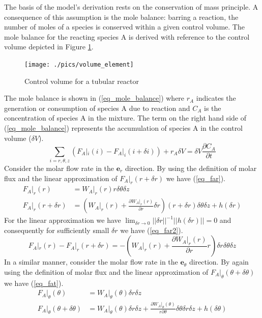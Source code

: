 \documentclass[11pt,fleqn]{article}
\theoremstyle{defstyle}
\begin{document}
The basis of the model's derivation rests on the conservation of mass principle. A consequence of this assumption is the mole balance: barring a reaction, the number of moles of a species is conserved within a given control volume. The mole balance for the reacting species A is derived with reference to the control volume depicted in Figure \ref{fig_vol_element}.

\begin{figure}[H] 
\centering
\texttt{[image: ./pics/volume\_element]}
\caption{Control volume for a tubular reactor} 
\label{fig_vol_element}
\end{figure}

The mole balance is shown in (\ref{eq_mole_balance}) where $r_A$ indicates the generation or consumption of species A due to reaction and $C_A$ is the concentration of species A in the mixture. The term on the right hand side of (\ref{eq_mole_balance}) represents the accumulation of species A in the control volume ($\delta V$).
\begin{equation}
\sum_{i=r, \theta, z}\left(F_A|_i(i) - F_A|_i(i+\delta i)\right) + r_A \delta V = \delta V \frac{\partial C_A}{\partial t}
\label{eq_mole_balance}
\end{equation}
Consider the molar flow rate in the $\mathbf{e}_r$ direction. By using the definition of molar flux and the linear approximation of $F_A|_r(r+\delta r)$ we have (\ref{eq_far}).
\begin{equation}
\begin{aligned}
F_A|_r(r) &= W_A|_r(r) r \delta \theta \delta z \\
F_A|_r(r+\delta r) &= \left(W_ A|_r(r) + \frac{\partial W_A|_r(r)}{\partial r} \delta r\right)(r+\delta r)\delta \theta \delta z + h(\delta r)
\end{aligned}
\label{eq_far}
\end{equation}
For the linear approximation we have $\lim_{\delta r \to 0} ||\delta r||^{-1}||h(\delta r)|| = 0 $ and consequently for sufficiently small $\delta r$ we have (\ref{eq_far2}).  
\begin{equation}
F_A|_r(r) - F_A|_r(r+\delta r)  = - \left(W_ A|_r(r)  + \frac{\partial W_A|_r(r)}{\partial r}r\right) \delta r \delta \theta \delta z
\label{eq_far2}
\end{equation}
In a similar manner, consider the molar flow rate in the $\mathbf{e}_\theta$ direction. By again using the definition of molar flux and the linear approximation of $F_A|_\theta(\theta+\delta \theta)$ we have (\ref{eq_fat}).
\begin{equation}
\begin{aligned}
F_A|_\theta(\theta) &= W_A|_\theta(\theta) \delta r \delta z \\
F_A|_\theta(\theta + \delta \theta) &= W_A|_\theta(\theta) \delta r \delta z + \frac{\partial W_A|_\theta(\theta)}{r \partial \theta}\delta \theta\delta r \delta z + h(\delta \theta)
\end{aligned}
\label{eq_fat}
\end{equation}
\end{document}
